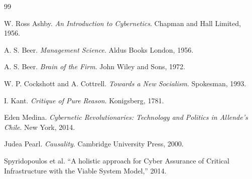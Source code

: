 \documentclass[11pt]{article}
\begin{document}
\begin{thebibliography}{99}

W. Ross Ashby.
\textit{An Introduction to Cybernetics}.
Chapman and Hall Limited, 1956.

A. S. Beer.
\textit{Management Science}.
Aldus Books London, 1956.

A. S. Beer.
\textit{Brain of the Firm}.
John Wiley and Sons, 1972.

W. P. Cockshott and A. Cottrell.
\textit{Towards a New Socialism}.
Spokesman, 1993.

I. Kant.
\textit{Critique of Pure Reason}.
Konigsberg, 1781.

Eden Medina.
\textit{Cybernetic Revolutionaries: Technology and Politics in Allende's Chile}.
New York, 2014.

Judea Pearl.
\textit{Causality}.
Cambridge University Press, 2000.

Spyridopoulos et al.
``A holistic approach for Cyber Assurance of Critical Infrastructure with the Viable System Model,''
2014.

\end{thebibliography}
\end{document}
